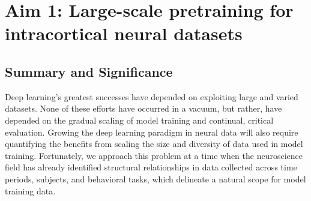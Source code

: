 \documentclass[12pt,oneside]{report}
\begin{document}



\chapter{Aim 1: Large-scale pretraining for intracortical neural datasets}

\section{Summary and Significance}

Deep learning’s greatest successes have depended on exploiting large and varied datasets. None of these efforts have occurred in a vacuum, but rather, have depended on the gradual scaling of model training and continual, critical evaluation. Growing the deep learning paradigm in neural data will also require quantifying the benefits from scaling the size and diversity of data used in model training. Fortunately, we approach this problem at a time when the neuroscience field has already identified structural relationships in data collected across time periods, subjects, and behavioral tasks, which delineate a natural scope for model training data.
\end{document}
